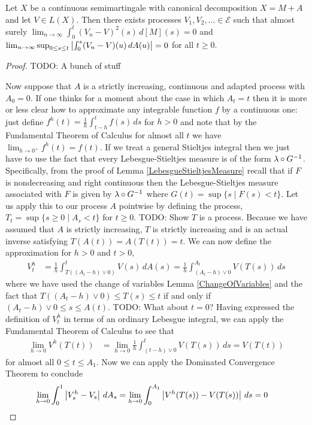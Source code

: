 \begin{lem}Let $X$ be a continuous semimartingale with canonical decomposition $X = M+A$ and let $V \in L(X)$.  Then there exists processes $V_1, V_2, \dotsc \in \mathcal{E}$ such that almost surely $\lim_{n \to \infty} \int_0^t (V_n -V)^2(s) \, d[M](s) = 0$ and $\lim_{n \to \infty} \sup_{0 \leq s \leq t} \left \vert \int_0^s (V_n-V)(u) \, dA(u)  \right \vert = 0$ for all $t \geq 0$.
\end{lem}
\begin{proof}
TODO: A bunch of stuff

Now suppose that $A$ is a strictly increasing, continuous and adapted process with $A_0=0$.  If one thinks for a moment about the case in which $A_t = t$ then it is more or less clear how to approximate any integrable function $f$ by a continuous one: just define $f^h(t) = \frac{1}{h}\int_{t-h}^t f(s) \, ds$ for $h > 0$ and note that by the Fundamental Theorem of Calculus for almost all $t$ we have $\lim_{h \to 0^+} f^h(t) = f(t)$.  If we treat a general Stieltjes integral then we just have to use the fact that every Lebesgue-Stieltjes measure is of the form $\lambda \circ G^{-1}$.  Specifically, from the proof of Lemma \ref{LebesgueStieltjesMeasure} recall that if $F$ is nondecreasing and right continuous then the Lebesgue-Stieltjes measure associated with $F$ is given by $\lambda \circ G^{-1}$ where
$G(t) = \sup\lbrace s \mid F(s) < t \rbrace$.
Let us apply this to our process $A$ pointwise by defining the process, $T_t = \sup \lbrace s \geq 0 \mid A_s < t \rbrace$ for $t \geq 0$.  TODO: Show $T$ is a process.  Because we have assumed that $A$ is strictly increasing, $T$ is strictly increasing and is an actual inverse satisfying $T(A(t)) = A(T(t)) = t$.  We can now define the approximation for $h > 0$ and $t > 0$,
\begin{align*}
V^h_t &= \frac{1}{h} \int_{T((A_t-h) \vee 0)}^t V(s) \, dA(s) = \frac{1}{h} \int_{(A_t-h) \vee 0}^{A_t} V(T(s)) \, ds
\end{align*}
where we have used the change of variables Lemma \ref{ChangeOfVariables} and the fact that $T((A_t - h) \vee 0)\leq T(s) \leq t$ if and only if $(A_t - h) \vee 0 \leq s \leq A(t)$.  TODO: What about $t=0$?  Having expressed the definition of $V^h_t$ in terms of an ordinary Lebesgue integral, we can apply the Fundamental Theorem of Calculus to see that 
\begin{align*}
\lim_{h \to 0} V^h (T(t)) &= \lim_{h \to 0} \frac{1}{h} \int_{(t-h) \vee 0}^{t} V(T(s)) \, ds = V(T(t))
\end{align*} 
for almost all $0 \leq t \leq A_1$.  Now we can apply the Dominated Convergence Theorem to conclude 
\begin{align*}
\lim_{h \to 0} \int_0^1 \left \vert V^h_s - V_s \right \vert \, dA_s &= \lim_{h \to 0} \int_0^{A_1} \left \vert V^h(T(s)) - V(T(s)) \right \vert \, ds = 0
\end{align*}
\end{proof}


